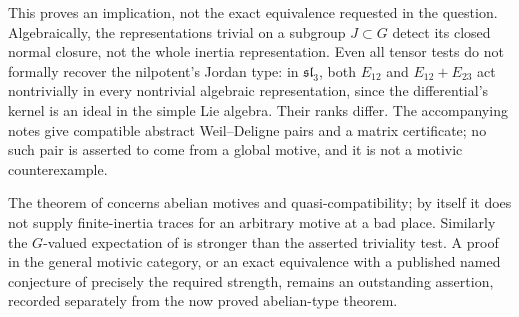 \begin{remark}
This proves an implication, not the exact equivalence requested in the question. Algebraically, the representations trivial on a subgroup $J\subset G$ detect its closed normal closure, not the whole inertia representation. Even all tensor tests do not formally recover the nilpotent's Jordan type: in $\mathfrak{sl}_3$, both $E_{12}$ and $E_{12}+E_{23}$ act nontrivially in every nontrivial algebraic representation, since the differential's kernel is an ideal in the simple Lie algebra. Their ranks differ. The accompanying notes give compatible abstract Weil--Deligne pairs and a matrix certificate; no such pair is asserted to come from a global motive, and it is not a motivic counterexample.

The theorem of \citet[Theorem 5.1]{c_commelin2019} concerns abelian motives and quasi-compatibility; by itself it does not supply finite-inertia traces for an arbitrary motive at a bad place. Similarly the $G$-valued expectation of \citet[Conjecture 1.1]{c_kisinzhou2025} is stronger than the asserted triviality test. A proof in the general motivic category, or an exact equivalence with a published named conjecture of precisely the required strength, remains an outstanding assertion, recorded separately from the now proved abelian-type theorem.
\end{remark}
